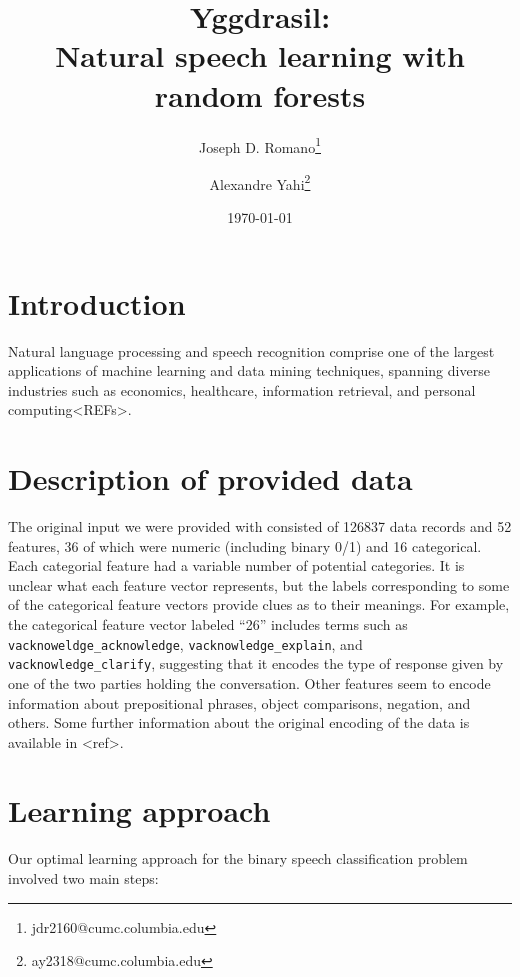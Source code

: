 \documentclass[11pt,a4paper]{article}
\begin{document}
\title{Yggdrasil:\\Natural speech learning with random forests}
\author[1]{Joseph D. Romano\thanks{jdr2160@cumc.columbia.edu}}
\author[1]{Alexandre Yahi\thanks{ay2318@cumc.columbia.edu}}
\renewcommand\Authands{ and }
\date{\today}
\maketitle


\section{Introduction}

Natural language processing and speech recognition comprise one of the largest applications of machine learning and data mining techniques, spanning diverse industries such as economics, healthcare, information retrieval, and personal computing<REFs>.

\section{Description of provided data}

The original input we were provided with consisted of 126837 data records and 52 features, 36 of which were numeric (including binary 0/1) and 16 categorical. Each categorial feature had a variable number of potential categories. It is unclear what each feature vector represents, but the labels corresponding to some of the categorical feature vectors provide clues as to their meanings. For example, the categorical feature vector labeled ``26'' includes terms such as {\tt vacknoweldge\_acknowledge}, {\tt vacknowledge\_explain}, and {\tt vacknowledge\_clarify}, suggesting that it encodes the type of response given by one of the two parties holding the conversation. Other features seem to encode information about prepositional phrases, object comparisons, negation, and others. Some further information about the original encoding of the data is available in <ref>.

\section{Learning approach}

Our optimal learning approach for the binary speech classification problem involved two main steps:
\end{document}
